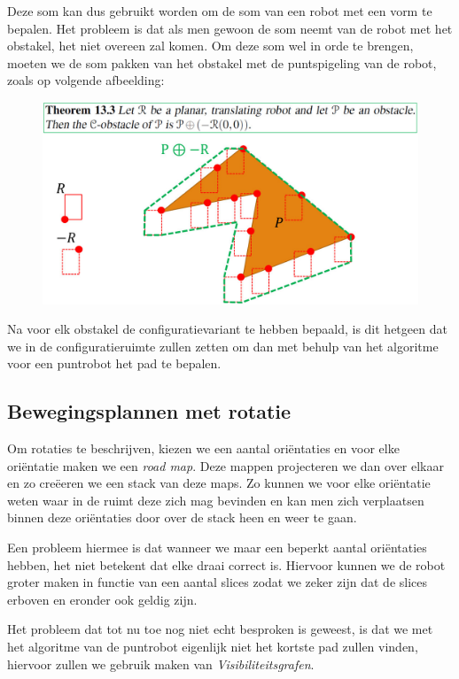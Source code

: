\documentclass[12pt,a4paper]{article}
\begin{document}
	Deze som kan dus gebruikt worden om de som van een robot met een vorm te bepalen. Het probleem is dat als men gewoon de som neemt van de robot met het obstakel, het niet overeen zal komen. Om deze som wel in orde te brengen, moeten we de som pakken van het obstakel met de puntspigeling van de robot, zoals op volgende afbeelding: 
	\begin{figure}[H]
		\centering
		\includegraphics[width=0.8\linewidth]{afbeeldingen/Motion-plannine/negatieveRobot}
		\label{fig:negatieverobot}
	\end{figure}
	
	Na voor elk obstakel de configuratievariant te hebben bepaald, is dit hetgeen dat we in de configuratieruimte zullen zetten om dan met behulp van het algoritme voor een puntrobot het pad te bepalen. 
	
	
	\subsection{Bewegingsplannen met rotatie}
	Om rotaties te beschrijven, kiezen we een aantal oriëntaties en voor elke oriëntatie maken we een \textit{road map}. Deze mappen projecteren we dan over elkaar en zo creëeren we een stack van deze maps. Zo kunnen we voor elke oriëntatie weten waar in de ruimt deze zich mag bevinden en kan men zich verplaatsen binnen deze oriëntaties door over de stack heen en weer te gaan. 
	
	Een probleem hiermee is dat wanneer we maar een beperkt aantal oriëntaties hebben, het niet betekent dat elke draai correct is. Hiervoor kunnen we de robot groter maken in functie van een aantal slices zodat we zeker zijn dat de slices erboven en eronder ook geldig zijn. 
	
	Het probleem dat tot nu toe nog niet echt besproken is geweest, is dat we met het algoritme van de puntrobot eigenlijk niet het kortste pad zullen vinden, hiervoor zullen we gebruik maken van \textit{Visibiliteitsgrafen}.
	
\end{document}
